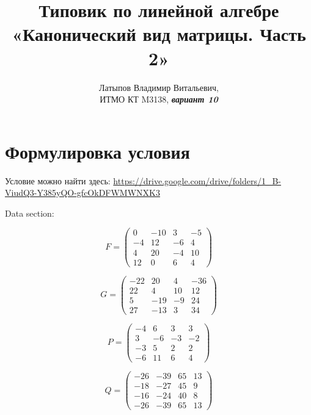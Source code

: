 \documentclass[12pt, a4paper]{article}
\author{Латыпов Владимир Витальевич, \\ ИТМО КТ M3138, \Huge{\textit{\textbf{вариант 10}}}}
\title{Типовик по линейной алгебре «Канонический вид матрицы. Часть 2»}
\begin{document}
    \tit

    \section{Формулировка условия}

    \begin{statement}
        Условие можно найти здесь: \url{https://drive.google.com/drive/folders/1_B-ViudQ3-Y385yQO-gfcOkDFWMWNXK3}

        Data section:

        \begin{equation}
            F = \left(\begin{matrix}
                0 & -10 & 3 & -5 \\
                -4 & 12 & -6 & 4 \\
                4 & 20 & -4 & 10 \\
                12 & 0 & 6 & 4
            \end{matrix}\right)
        \end{equation}

        \begin{equation}
            G = \left(\begin{matrix}
                -22 & 20 & 4 & -36 \\
                22 & 4 & 10 & 12 \\
                5 & -19 & -9 & 24 \\
                27 & -13 & 3 & 34
            \end{matrix}\right)
        \end{equation}

        \begin{equation}
            P = \left(\begin{matrix}
                -4 & 6 & 3 & 3 \\
                3 & -6 & -3 & -2 \\
                -3 & 5 & 2 & 2 \\
                -6 & 11 & 6 & 4
            \end{matrix}\right)
        \end{equation}

        \begin{equation}
            Q = \left(\begin{matrix}
                -26 & -39 & 65 & 13 \\
                -18 & -27 & 45 & 9 \\
                -16 & -24 & 40 & 8 \\
                -26 & -39 & 65 & 13
            \end{matrix}\right)
        \end{equation}


\end{statement}
\end{document}
